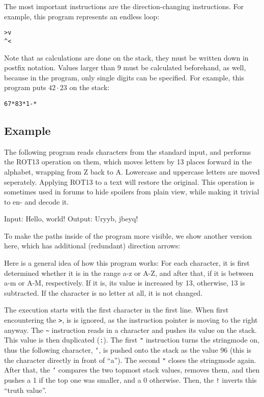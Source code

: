 The most important instructions are the direction-changing instructions. For example, this program represents an endless loop:

\begin{lstlisting}
>v
^<
\end{lstlisting}

Note that as calculations are done on the stack, they must be written down in postfix notation. Values larger than 9 must be calculated beforehand, as well, because in the program, only single digits can be specified. For example, this program puts $42\cdot 23$ on the stack:

\begin{lstlisting}
67*83*1-*
\end{lstlisting}

\subsection{Example}

The following program reads characters from the standard input, and performs the ROT13 operation on them, which moves letters by 13 places forward in the alphabet, wrapping from Z back to A. Lowercase and uppercase letters are moved seperately. Applying ROT13 to a text will restore the original. This operation is sometimes used in forums to hide spoilers from plain view, while making it trivial to en- and decode it.



\begin{io}
Input: Hello, world!
Output: Uryyb, jbeyq!
\end{io}

To make the paths inside of the program more visible, we show another version here, which has additional (redundant) direction arrows:



Here is a general idea of how this program works: For each character, it is first determined whether it is in the range a-z or A-Z, and after that, if it is between a-m or A-M, respectively. If it is, its value is increased by 13, otherwise, 13 is subtracted. If the character is no letter at all, it is not changed.

The execution starts with the first character in the first line. When first encountering the \texttt{>}, is is ignored, as the instruction pointer is moving to the right anyway. The \texttt{\~} instruction reads in a character and pushes its \ascii{} value on the stack. This value is then duplicated (\texttt{:}). The first \texttt{"} instruction turns the stringmode on, thus the following character, \texttt{`}, is pushed onto the stack as the value 96 (this is the character directly in front of “a”). The second \texttt{"} closes the stringmode again. After that, the \texttt{`} compares the two topmost stack values, removes them, and then pushes a 1 if the top one was smaller, and a 0 otherwise. Then, the \texttt{!} inverts this “truth value”.

